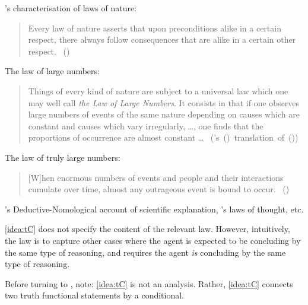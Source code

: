 \begin{note}
{    \citeauthor{Helmholtz:1977aa}'s characterisation of laws of nature:%
    \begin{quote}
      \nocite{Wilson:2006aa}
      Every law of nature asserts that upon preconditions alike in a certain respect, there always follow consequences that are alike in a certain other respect.%
      \mbox{ }\hfill\mbox{(\citeyear[122]{Helmholtz:1977aa})}
    \end{quote}
    The law of large numbers:
    \begin{quote}
      Things of every kind of nature are subject to a universal law which one may well call \emph{the Law of Large Numbers}.
      It consists in that if one observes large numbers of events of the same nature depending on causes which are constant and causes which vary irregularly, \dots, one finds that the proportions of occurrence are almost constant \dots\newline
      \mbox{ }\hfill\mbox{(\citeauthor{Seneta:2013aa}'s (\citeyear[9--10]{Seneta:2013aa}) translation of (\cite[7]{Poisson:1837aa}))}
    \end{quote}
    The law of truly large numbers:
    \begin{quote}
      [W]hen enormous numbers of events and people and their interactions cumulate over time, almost any outrageous event is bound to occur.%
      \mbox{ }\hfill\mbox{(\cite[853]{Diaconis:1989aa})}
    \end{quote}
    \citeauthor{Hempel:1965aa}'s Deductive-Nomological account of scientific explanation, \citeauthor{Boole:1854aa}'s laws of thought, etc.
  }

  \autoref{idea:tC} does not specify the content of the relevant law.
  However, intuitively, the law is to capture other cases where the agent is expected to be concluding by the same type of reasoning, and requires the agent \emph{is} concluding by the same type of reasoning.
\end{note}

\begin{note}
  Before turning to , note:
  \autoref{idea:tC} is not an analysis.
    Rather, \autoref{idea:tC} connects two truth functional statements by a conditional.
\end{note}



\subsection{}
\label{sec:illu3-1}

